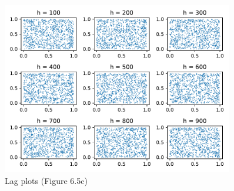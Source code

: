 \documentclass[11pt,a4paper]{article}
\begin{document}
\begin{figure}[ht]
  \centering
  \includegraphics[width=0.9\textwidth]{fig-6_5c}
  \caption{Lag plots (Figure 6.5c)}
  \label{fig:6_5c}
\end{figure}
\end{document}
